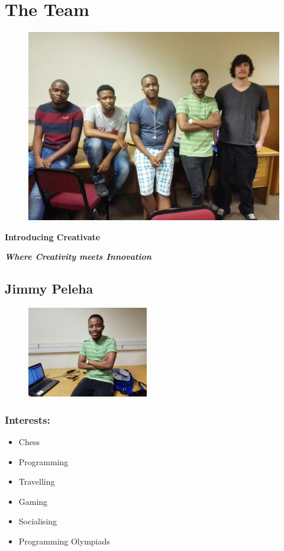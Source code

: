 \section{The Team}

\begin{figure}[h]
			\centering
			\includegraphics[width=450px]{images/group.jpg}
\end{figure}
		
		\begin{center}
		\textbf{\Huge Introducing Creativate }
		
		\textbf{\emph{Where Creativity meets Innovation}}
		\end{center}
		\newpage
\subsection{Jimmy Peleha}

\begin{figure}[h]
			\center
			\includegraphics[width=200px]{images/Jimmy.jpg}
\end{figure}

\subsubsection{Interests:}
\begin{itemize}
	\item Chess
	\item Programming
	\item Travelling
	\item Gaming
	\item Socialising
	\item Programming Olympiads
\end{itemize}

